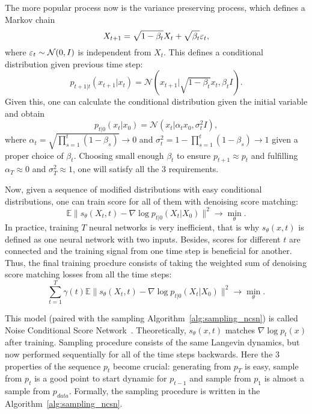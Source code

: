 The more popular process now is the variance preserving process, which defines a Markov chain
\begin{equation}\label{eq:vp_process}
    X_{t + 1} = \sqrt{1 - \beta_t} X_t + \sqrt{\beta_t} \varepsilon_t,    
\end{equation}
where $\varepsilon_t \sim \mathcal{N}(0, I)$ is independent from $X_t$. This defines a conditional distribution given previous time step:
\[
    p_{t + 1 | t}(x_{t + 1} | x_t) = \mathcal{N}(x_{t + 1} | \sqrt{1 - \beta_t} x_t, \beta_t I).
\]
Given this, one can calculate the conditional distribution given the initial variable and obtain~\cite{ho2020denoising}
\[
    p_{t | 0}(x_t | x_0) = \mathcal{N}(x_t | \alpha_t x_0, \sigma^2_t I),
\]
where $\alpha_t = \sqrt{\prod_{s = 1}^{t} (1 - \beta_s)} \rightarrow 0$ and $\sigma^2_t = 1 - \prod_{s = 1}^{t}(1 - \beta_s) \rightarrow 1$ given a proper choice of $\beta_t$. Choosing small enough $\beta_t$ to ensure $p_{t + 1} \approx p_{t}$ and fulfilling $\alpha_T \approx 0$ and $\sigma_T^2 \approx 1$, one will satisfy all the 3 requirements.

Now, given a sequence of modified distributions with easy conditional distributions, one can train score for all of them with denoising score matching:
\[
    \mathbb{E}\|s_\theta(X_t, t) - \nabla \log p_{t | 0}(X_t | X_0) \|^2 \rightarrow \min\limits_{\theta}.
\]
In practice, training $T$ neural networks is very inefficient, that is why $s_\theta(x, t)$ is defined as one neural network with two inputs. Besides, scores for different $t$ are connected and the training signal from one time step is beneficial for another. Thus, the final training procdure consists of taking the weighted sum of denoising score matching losses from all the time steps:
\begin{equation}\label{eq:ncsn_training}
    \sum\limits_{t = 1}^{T} \gamma(t) \mathbb{E}\|s_\theta(X_t, t) - \nabla \log p_{t | 0}(X_t | X_0) \|^2 \rightarrow \min\limits_{\theta}.
\end{equation}

This model (paired with the sampling Algorithm~\ref{alg:sampling_ncsn}) is called Noise Conditional Score Network~\cite{song2019generative}. Theoretically, $s_{\theta}(x, t)$ matches $\nabla \log p_{t}(x)$ after training. Sampling procedure consists of the same Langevin dynamics, but now performed sequentially for all of the time steps backwards. Here the 3 properties of the sequence $p_t$ become crucial: generating from $p_T$ is easy, sample from $p_{t}$ is a good point to start dynamic for $p_{t - 1}$ and sample from $p_{1}$ is almost a sample from $p_{data}$. Formally, the sampling procedure is written in the Algorithm~\ref{alg:sampling_ncsn}.

